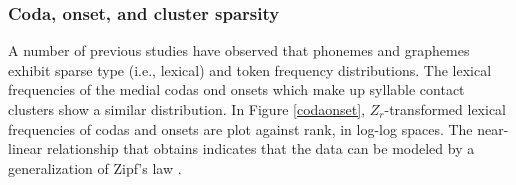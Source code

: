
\subsubsection{Coda, onset, and cluster sparsity}

A number of previous studies \citep[e.g.,][]{Sigurd1968,Good1969,Borodovsky1989,Witten1990,Martindale1996,Tambovtsev2007} have observed that phonemes and graphemes exhibit sparse type (i.e., lexical) and token frequency distributions. The lexical frequencies of the medial codas ond onsets which make up syllable contact clusters show a similar distribution. In Figure \ref{codaonset}, $Z_r$-transformed lexical frequencies of codas and onsets are plot against rank, in log-log spaces. The near-linear relationship that obtains indicates that the data can be modeled by a generalization of Zipf's law \citep{Zipf1949}.

